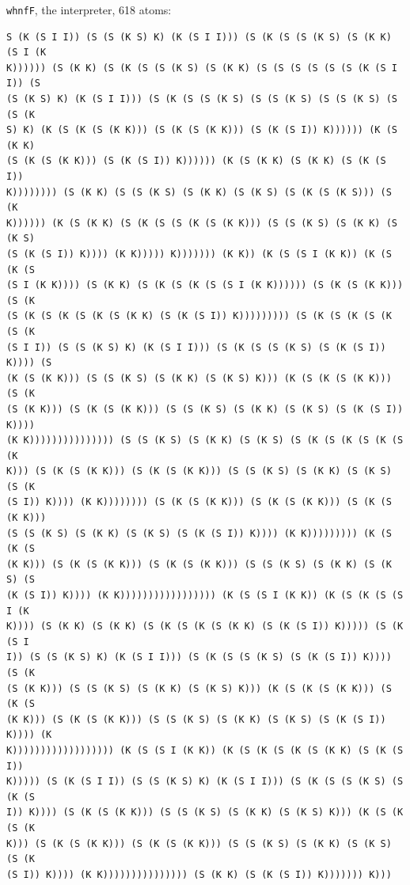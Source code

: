 \documentclass[review]{jfp-epi}
\begin{document}
\texttt{whnfF}, the interpreter, 618 atoms:
\begin{verbatim}
S (K (S I I)) (S (S (K S) K) (K (S I I))) (S (K (S (S (K S) (S (K K) (S I (K
K)))))) (S (K K) (S (K (S (S (K S) (S (K K) (S (S (S (S (S (S (K (S I I)) (S
(S (K S) K) (K (S I I))) (S (K (S (S (K S) (S (S (K S) (S (S (K S) (S (S (K
S) K) (K (S (K (S (K K))) (S (K (S (K K))) (S (K (S I)) K)))))) (K (S (K K)
(S (K (S (K K))) (S (K (S I)) K)))))) (K (S (K K) (S (K K) (S (K (S I))
K)))))))) (S (K K) (S (S (K S) (S (K K) (S (K S) (S (K (S (K S))) (S (K
K)))))) (K (S (K K) (S (K (S (S (K (S (K K))) (S (S (K S) (S (K K) (S (K S)
(S (K (S I)) K)))) (K K))))) K))))))) (K K)) (K (S (S I (K K)) (K (S (K (S
(S I (K K)))) (S (K K) (S (K (S (K (S (S I (K K)))))) (S (K (S (K K))) (S (K
(S (K (S (K (S (K (S (K K) (S (K (S I)) K))))))))) (S (K (S (K (S (K (S (K
(S I I)) (S (S (K S) K) (K (S I I))) (S (K (S (S (K S) (S (K (S I)) K)))) (S
(K (S (K K))) (S (S (K S) (S (K K) (S (K S) K))) (K (S (K (S (K K))) (S (K
(S (K K))) (S (K (S (K K))) (S (S (K S) (S (K K) (S (K S) (S (K (S I)) K))))
(K K))))))))))))))) (S (S (K S) (S (K K) (S (K S) (S (K (S (K (S (K (S (K
K))) (S (K (S (K K))) (S (K (S (K K))) (S (S (K S) (S (K K) (S (K S) (S (K
(S I)) K)))) (K K)))))))) (S (K (S (K K))) (S (K (S (K K))) (S (K (S (K K)))
(S (S (K S) (S (K K) (S (K S) (S (K (S I)) K)))) (K K))))))))) (K (S (K (S
(K K))) (S (K (S (K K))) (S (K (S (K K))) (S (S (K S) (S (K K) (S (K S) (S
(K (S I)) K)))) (K K))))))))))))))))) (K (S (S I (K K)) (K (S (K (S (S I (K
K)))) (S (K K) (S (K K) (S (K (S (K (S (K K) (S (K (S I)) K))))) (S (K (S I
I)) (S (S (K S) K) (K (S I I))) (S (K (S (S (K S) (S (K (S I)) K)))) (S (K
(S (K K))) (S (S (K S) (S (K K) (S (K S) K))) (K (S (K (S (K K))) (S (K (S
(K K))) (S (K (S (K K))) (S (S (K S) (S (K K) (S (K S) (S (K (S I)) K)))) (K
K)))))))))))))))))) (K (S (S I (K K)) (K (S (K (S (K (S (K K) (S (K (S I))
K))))) (S (K (S I I)) (S (S (K S) K) (K (S I I))) (S (K (S (S (K S) (S (K (S
I)) K)))) (S (K (S (K K))) (S (S (K S) (S (K K) (S (K S) K))) (K (S (K (S (K
K))) (S (K (S (K K))) (S (K (S (K K))) (S (S (K S) (S (K K) (S (K S) (S (K
(S I)) K)))) (K K))))))))))))))) (S (K K) (S (K (S I)) K))))))) K)))
\end{verbatim}
\end{document}
